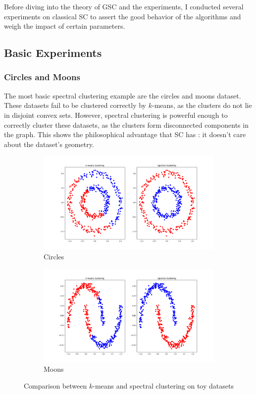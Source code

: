 \documentclass[a4paper,12pt]{article}
\theoremstyle{definition}
\theoremstyle{plain}
\begin{document}
Before diving into the theory of GSC and the experiments, I conducted several experiments on classical SC to assert the good behavior of the algorithms and weigh the impact of certain parameters.
\subsection{Basic Experiments}
\subsubsection{Circles and Moons}
The most basic spectral clustering example are the circles and moons dataset. These datasets fail to be clustered correctly by $k$-means, as the clusters do not lie in disjoint convex sets. However, spectral clustering is powerful enough to correctly cluster these datasets, as the clusters form disconnected components in the graph. This shows the philosophical advantage that SC has : it doesn't care about the dataset's geometry.

\begin{figure}[H]
	\begin{subfigure}{.6\textwidth}
		\centering
		\includegraphics[width=0.9\linewidth]{figures/Fig1}
		\caption{Circles}
	\end{subfigure}
	\begin{subfigure}{.6\textwidth}
		\centering
		\includegraphics[width=0.9\linewidth]{figures/Fig2}
		\caption{Moons}
	\end{subfigure}
	\caption{Comparison between $k$-means and spectral clustering on toy datasets}
\end{figure}
\end{document}
